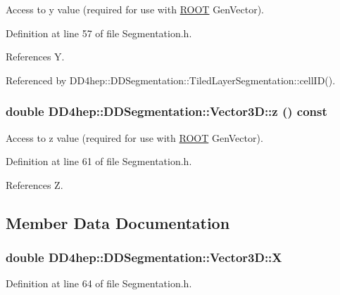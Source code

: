 Access to y value (required for use with \hyperlink{namespace_r_o_o_t}{ROOT} GenVector). 

Definition at line 57 of file Segmentation.h.

References Y.

Referenced by DD4hep::DDSegmentation::TiledLayerSegmentation::cellID().\hypertarget{struct_d_d4hep_1_1_d_d_segmentation_1_1_vector3_d_ab30126e2b17eeb8638b4c5ebbb1b5278}{
\subsubsection[{z}]{\setlength{\rightskip}{0pt plus 5cm}double DD4hep::DDSegmentation::Vector3D::z () const}}
\label{struct_d_d4hep_1_1_d_d_segmentation_1_1_vector3_d_ab30126e2b17eeb8638b4c5ebbb1b5278}


Access to z value (required for use with \hyperlink{namespace_r_o_o_t}{ROOT} GenVector). 

Definition at line 61 of file Segmentation.h.

References Z.

\subsection{Member Data Documentation}
\hypertarget{struct_d_d4hep_1_1_d_d_segmentation_1_1_vector3_d_ac48f4f10c3545a48be92b2f970177868}{
\subsubsection[{X}]{\setlength{\rightskip}{0pt plus 5cm}double {\bf DD4hep::DDSegmentation::Vector3D::X}}}
\label{struct_d_d4hep_1_1_d_d_segmentation_1_1_vector3_d_ac48f4f10c3545a48be92b2f970177868}


Definition at line 64 of file Segmentation.h.

